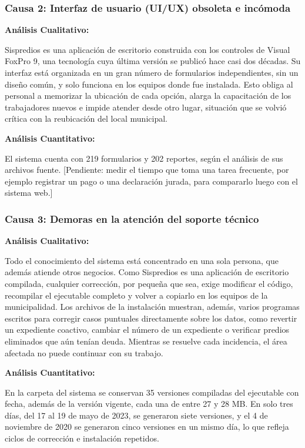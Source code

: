 \documentclass[12pt,a4paper]{report}
\begin{document}
\subsubsection*{Causa 2: Interfaz de usuario (UI/UX) obsoleta e incómoda}

\textbf{Análisis Cualitativo:}

Sispredios es una aplicación de escritorio construida con los controles de Visual FoxPro 9, una tecnología cuya última versión se publicó hace casi dos décadas. Su interfaz está organizada en un gran número de formularios independientes, sin un diseño común, y solo funciona en los equipos donde fue instalada. Esto obliga al personal a memorizar la ubicación de cada opción, alarga la capacitación de los trabajadores nuevos e impide atender desde otro lugar, situación que se volvió crítica con la reubicación del local municipal.

\textbf{Análisis Cuantitativo:}

El sistema cuenta con 219 formularios y 202 reportes, según el análisis de sus archivos fuente. [Pendiente: medir el tiempo que toma una tarea frecuente, por ejemplo registrar un pago o una declaración jurada, para compararlo luego con el sistema web.]

\subsubsection*{Causa 3: Demoras en la atención del soporte técnico}

\textbf{Análisis Cualitativo:}

Todo el conocimiento del sistema está concentrado en una sola persona, que además atiende otros negocios. Como Sispredios es una aplicación de escritorio compilada, cualquier corrección, por pequeña que sea, exige modificar el código, recompilar el ejecutable completo y volver a copiarlo en los equipos de la municipalidad. Los archivos de la instalación muestran, además, varios programas escritos para corregir casos puntuales directamente sobre los datos, como revertir un expediente coactivo, cambiar el número de un expediente o verificar predios eliminados que aún tenían deuda. Mientras se resuelve cada incidencia, el área afectada no puede continuar con su trabajo.

\textbf{Análisis Cuantitativo:}

En la carpeta del sistema se conservan 35 versiones compiladas del ejecutable con fecha, además de la versión vigente, cada una de entre 27 y 28 MB. En solo tres días, del 17 al 19 de mayo de 2023, se generaron siete versiones, y el 4 de noviembre de 2020 se generaron cinco versiones en un mismo día, lo que refleja ciclos de corrección e instalación repetidos.
\end{document}
